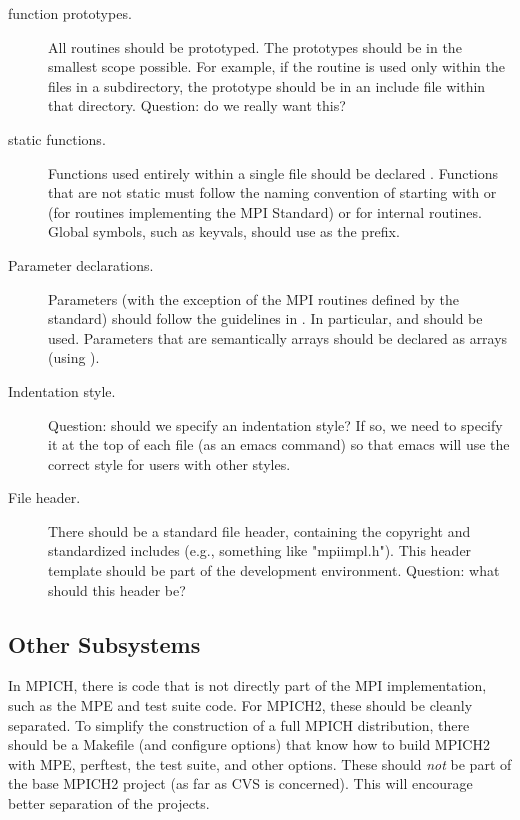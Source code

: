 \documentclass{article}
\begin{document}
\begin{description}
\item[function prototypes.]
All routines should be prototyped.  The prototypes should be in the
smallest scope possible.  For example, if the routine is used only
within the files in a subdirectory, the prototype should be in an
include file within that directory.
Question: do we really want this?

\item[static functions.]
Functions used entirely within a single file should be declared
.  Functions that are not static must follow the naming
convention of starting with  or  (for routines
implementing the MPI Standard) or  for internal routines.  
Global symbols, such as keyvals, should use  as the
prefix.  

\item[Parameter declarations.]
Parameters (with the exception of the MPI routines defined by the
standard) should follow the guidelines in .  In
particular,  and  should be used.
Parameters that are semantically arrays should be declared as arrays
(using \code{[]}).  

\item[Indentation style.]
Question: should we specify an indentation style?  If so, we need to
specify it at the top of each file (as an emacs command) so that emacs
will use the correct style for users with other styles.

\item[File header.]
There should be a standard file header, containing the copyright and
standardized includes (e.g., something like "mpiimpl.h").  This header
template should be part of the development environment.  Question:
what should this header be?

\end{description}

\subsection{Other Subsystems}
In MPICH, there is code that is not directly part of the MPI
implementation, such as the MPE and test suite code.  For MPICH2,
these should be cleanly separated.  To simplify the construction of a
full MPICH distribution, there should be a Makefile (and configure
options) that know how to build MPICH2 with MPE, perftest, the test
suite, and other options.  These should \emph{not} be part of the base
MPICH2 project (as far as CVS is concerned).  This will encourage
better separation of the projects.
\end{document}
